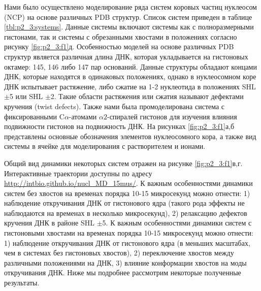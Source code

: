Нами было осуществлено моделирование ряда систем коровых частиц нуклеосом (NCP) на основе различных PDB структур.
Список систем приведен в таблице \ref{tbl:p2_3:systems}. Данные системы включают системы как с полноразмерными гистонами, так и системы с обрезанными хвостами в положениях согласно рисунку \ref{fig:p2_3:f1}д. Особенностью моделей на основе различных PDB структур является различная длина ДНК, которая укладывается на гистоновых октамер: 145, 146 либо 147 пар оснований. Данные структуры обладают концами ДНК, которые находятся в одинаковых положениях, однако в нуклеосомном коре ДНК испытывает растяжение, либо сжатие на 1-2 нуклеотида в положениях SHL $\pm$5 или SHL $\pm$2. Такие области растяжения или сжатия называют дефектами кручения (twist defects). Также нами была промоделирована система с фиксированными C$\alpha$-атомами $\alpha 2$-спиралей гистонов для изучения влияния подвижности гистонов на подвижность ДНК. На рисунках \ref{fig:p2_3:f1}а,б представлены основные обозначения элементов нуклеосомного кора, а также вид системы в ячейке для моделирования с растворителем и ионами.

Общий вид динамики некоторых систем отражен на рисунке \ref{fig:p2_3:f1}в,г. Интерактивные траектории доступны по адресу \url{http://intbio.github.io/nucl_MD_15mus/}. К важным особенностями динамики систем без хвостов на временах порядка 10-15 микросекунд можно отнести: 1) наблюдение откручивания ДНК от гистонового ядра (такого рода эффекты не наблюдаются на временах в несколько микросекунд), 2) релаксацию дефектов кручения ДНК в районе SHL $\pm$5. К важным особенностями динамики систем с гистоновыми хвостами на временах порядка 10-15 микросекунд можно отнести: 1) наблюдение откручивания ДНК от гистонового ядра (в меньших масштабах, чем в системах без гистоновых хвостов), 2) переключение хвостов между различными положениями на ДНК, 3) влияние конформации хвостов на моды откручивания ДНК. Ниже мы подробнее рассмотрим некоторые полученные результаты. 


